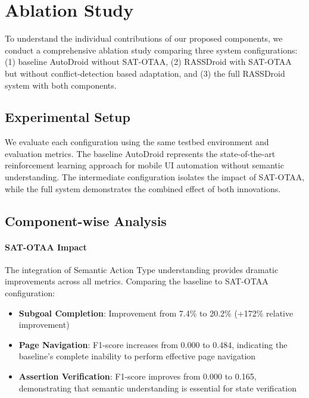 
\section{Ablation Study}

To understand the individual contributions of our proposed components, we conduct a comprehensive ablation study comparing three system configurations: (1) baseline AutoDroid without SAT-OTAA, (2) RASSDroid with SAT-OTAA but without conflict-detection based adaptation, and (3) the full RASSDroid system with both components.

\subsection{Experimental Setup}

We evaluate each configuration using the same testbed environment and evaluation metrics. The baseline AutoDroid represents the state-of-the-art reinforcement learning approach for mobile UI automation without semantic understanding. The intermediate configuration isolates the impact of SAT-OTAA, while the full system demonstrates the combined effect of both innovations.



\subsection{Component-wise Analysis}

\paragraph{SAT-OTAA Impact} 
The integration of Semantic Action Type understanding provides dramatic improvements across all metrics. Comparing the baseline to SAT-OTAA configuration:

\begin{itemize}
    \item \textbf{Subgoal Completion}: Improvement from 7.4\% to 20.2\% (+172\% relative improvement)
    \item \textbf{Page Navigation}: F1-score increases from 0.000 to 0.484, indicating the baseline's complete inability to perform effective page navigation
    \item \textbf{Assertion Verification}: F1-score improves from 0.000 to 0.165, demonstrating that semantic understanding is essential for state verification
\end{itemize}

